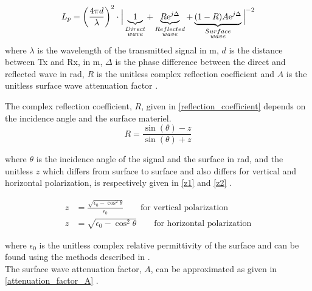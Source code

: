 \begin{equation}
L_p=\left(\frac{4 \pi d}{\lambda}\right)^2 \cdot \Big|\underbrace{1}_{\begin{subarray}{c}Direct\\wave\end{subarray}}+\underbrace{R\text{e}^{j\Delta}}_{\begin{subarray}{c}Reflected\\wave\end{subarray}}+\underbrace{(1-R)A\text{e}^{j\Delta}}_{\begin{subarray}{c}Surface\\wave\end{subarray}}\Big|^{-2} 
\label{ground_wave}
\end{equation}
where
$\lambda$ is the wavelength of the transmitted signal in m, $d$ is the distance between Tx and Rx, in m, $\Delta$ is the phase difference between the direct and reflected wave in rad, $R$ is the unitless complex reflection coefficient and $A$ is the unitless surface wave attenuation factor \cite{Chong,Bullington}. 


The complex reflection coefficient, $R$, given in \eqref{reflection_coefficient} depends on the incidence angle and the surface materiel.
\begin{equation}
R = \frac{\sin(\theta)-z}{\sin(\theta)+z}
\label{reflection_coefficient}
\end{equation}

where $\theta$ is the incidence angle of the signal and the surface in rad, and the unitless $z$ which differs from surface to surface and also differs for vertical and horizontal polarization, is respectively given in \eqref{z1} and \eqref{z2} \cite{Bullington}.

\begin{align}
z &= \frac{\sqrt{\epsilon_{0}-\cos^{2}\theta}}{\epsilon_{0}} \qquad \text{for vertical polarization} \label{z1}\\
z &= \sqrt{\epsilon_{0}-\cos^{2}\theta}  \qquad \text{for horizontal polarization}
\label{z2}
\end{align}

where $\epsilon_{0}$ is the unitless complex relative permittivity of the surface and can be found using the methods described in \cite{Kim}.\\
The surface wave attenuation factor, $A$, can be approximated as given in \eqref{attenuation_factor_A} \cite{Chong, Bullington}. 


